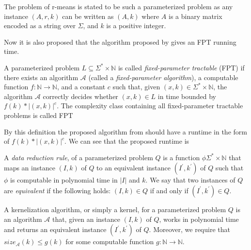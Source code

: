 \documentclass[a4paper]{article}
\begin{document}
The problem of r-means is stated to be such a parameterized problem as any instance $(A,r,k)$
can be written as $(A, k)$ where $A$ is a binary matrix encoded as a string over $\Sigma$, and
$k$ is a positive integer.

Now it is also proposed that the algorithm proposed by \cite{fomin_golovach_panolan_2020} 
gives an FPT running time.

\begin{theoremdefinition}
    A parameterized problem $L \subseteq \Sigma^* \times \mathbb{N}$ is called
    \textit{fixed-parameter tractable} (FPT) if there exists an algorithm $\mathcal{A}$ (called
    a \textit{fixed-parameter algorithm}), a computable function $f:\mathbb{N} \rightarrow \mathbb{N}$,
    and a constant $c$ such that, given $(x,k) \in \Sigma^* \times \mathbb{N}$, the algorithm
    $\mathcal{A}$ correctly decides whether $(x,k) \in L$ in time bounded by $f(k) * |(x,k)|^c$.
    The complexity class containing all fixed-parameter tractable problems is called FPT \cite[p.~13]{param_algo_book}
\end{theoremdefinition}

By this definition the proposed algorithm from \cite{fomin_golovach_panolan_2020} should have 
a runtime in the form of $f(k) * |(x,k)|^c$. We can see that the proposed runtime is 

\begin{theoremdefinition}
    A \textit{data reduction rule}, of a parameterized problem $Q$ is a function 
    $\phi \Sigma^* \times \mathbb{N}$ that maps an instance $(I,k)$ of $Q$ to an equivalent
    instance $(I^\prime, k^\prime)$ of $Q$ such that $\phi$ is computable in polynomial time
    in $|I|$ and $k$. We say that two instances of $Q$ are \textit{equivalent} if the following
    holds: $(I,k) \in Q$ if and only if $(I^\prime, k^\prime) \in Q$. 
    \cite{fomin_golovach_panolan_2020}
\end{theoremdefinition}

\begin{theoremdefinition}
    A kernelization algorithm, or simply a kernel, for a parameterized problem $Q$
    is an algorithm $\mathcal{A}$ that, given an instance $(I,k)$ of $Q$, works in polynomial
    time and returns an equivalent instance $(I^\prime, k^\prime)$ of $Q$. Moreover, we require
    that $size_{\mathcal{A}}(k) \leq g(k)$ for some computable function
    $g: \mathbb{N} \rightarrow \mathbb{N}$. \cite[p.~18]{param_algo_book}
\end{theoremdefinition}
\end{document}
